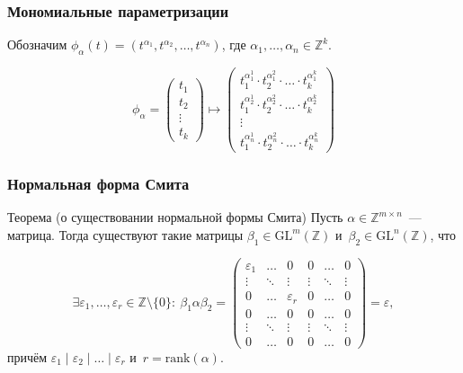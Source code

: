 \documentclass{beamer}
\newcommand{\Z}{\mathbb{Z}}
\newcommand{\GL}{\mathrm{GL}}
\newcommand{\divides}{\mid}
\begin{document}
\begin{frame}
  \frametitle{Мономиальные параметризации}

  Обозначим $\phi_\alpha(t) = (t^{\alpha_1}, t^{\alpha_2}, \ldots, t^{\alpha_n})$,
  где $\alpha_1, \ldots, \alpha_n \in \Z^k$.

  $$
    \phi_\alpha =
    \begin{pmatrix}
        t_1 \\
        t_2 \\
        \vdots \\
        t_k
    \end{pmatrix} \mapsto
    \begin{pmatrix}
        t_1^{\alpha_1^1} \cdot t_2^{\alpha_1^2} \cdot \ldots \cdot t_k^{\alpha_1^k} \\
        t_1^{\alpha_2^1} \cdot t_2^{\alpha_2^2} \cdot \ldots \cdot t_k^{\alpha_2^k} \\
        \vdots \\
        t_1^{\alpha_n^1} \cdot t_2^{\alpha_n^2} \cdot \ldots \cdot t_k^{\alpha_n^k}
    \end{pmatrix}
  $$
\end{frame}

\begin{frame}
  \frametitle{Нормальная форма Смита}

  \begin{block}{Теорема (о существовании нормальной формы Смита)}
      Пусть $\alpha \in \Z^{m \times n}$~— матрица.
      Тогда существуют такие матрицы $\beta_1 \in \GL^m(\Z)$
      и~$\beta_2 \in \GL^n(\Z)$, что

      $$
      \exists \varepsilon_1, \ldots, \varepsilon_r \in \Z \setminus \{0\}{:} \
      \beta_1 \alpha \beta_2 =
      \begin{pmatrix}
        \varepsilon_1 & \ldots & 0             & 0      & \ldots & 0      \\
               \vdots & \ddots & \vdots        & \vdots & \ddots & \vdots \\
                    0 & \ldots & \varepsilon_r & 0      & \ldots & 0      \\
                    0 & \ldots & 0             & 0      & \ldots & 0      \\
               \vdots & \ddots & \vdots        & \vdots & \ddots & \vdots \\
                    0 & \ldots & 0             & 0      & \ldots & 0
      \end{pmatrix} = \varepsilon,
      $$
      причём $\varepsilon_1 \divides \varepsilon_2 \divides \ldots \divides \varepsilon_r$ и~$r = \mathrm{rank}(\alpha)$.
  \end{block}
\end{frame}
\end{document}
